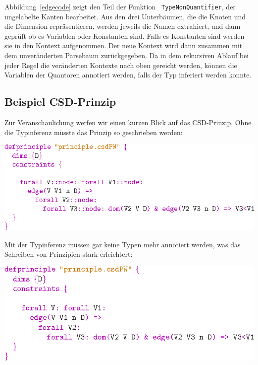 Abbildung~\ref{edgecode} zeigt den Teil der Funktion {\tt
  TypeNonQuantifier}, der ungelabelte Kanten bearbeitet. Aus den drei
Unterb\"aumen, die die Knoten und die Dimension repr\"asentieren,
werden jeweils die Namen extrahiert, und dann gepr\"uft ob es
Variablen oder Konstanten sind. Falls es Konstanten sind werden sie in
den Kontext aufgenommen. Der neue Kontext wird dann zusammen mit dem
unver\"anderten Parsebaum zur\"uckgegeben. Da in dem rekursiven Ablauf
bei jeder Regel die ver\"anderten Kontexte nach oben gereicht werden,
k\"onnen die Variablen der Quantoren annotiert werden, falls der Typ
inferiert werden konnte.

\subsection{Beispiel CSD-Prinzip}

Zur Veranschaulichung werfen wir einen kurzen Blick auf das
CSD-Prinzip. Ohne die Typinferenz m\"usste das Prinzip so geschrieben
werden:

\begin{center}
\includegraphics[scale=1.0]{eps/csdvorher}
\end{center}

Mit der Typinferenz m\"ussen gar keine Typen mehr annotiert werden,
was das Schreiben von Prinzipien stark erleichtert:

\begin{center}
\includegraphics[scale=1.0]{eps/csdnachher}
\end{center}
